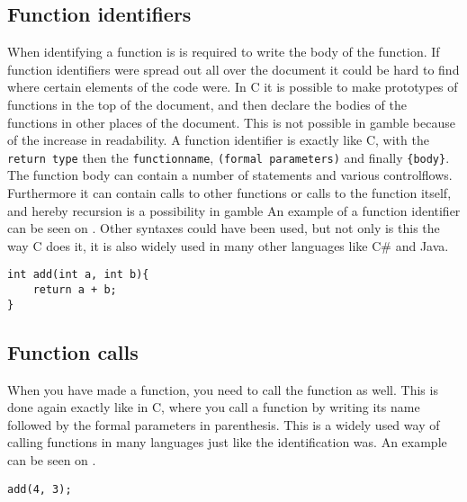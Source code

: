 \subsection*{Function identifiers}
When identifying a function is is required to write the body of the function.
If function identifiers were spread out all over the document it could be hard to find where certain elements of the code were.
In C it is possible to make prototypes of functions in the top of the document, and then declare the bodies of the functions in other places of the document. 
This is not possible in \gls{gamble} because of the increase in readability.
A function identifier is exactly like C, with the \texttt{return type} then the \texttt{functionname}, \texttt{(formal parameters)} and finally \texttt{\{body\}}.
The function body can contain a number of statements and various controlflows.
Furthermore it can contain calls to other functions or calls to the function itself, and hereby recursion is a possibility in \gls{gamble}
An example of a function identifier can be seen on .
Other syntaxes could have been used, but not only is this the way C does it, it is also widely used in many other languages like C\# and Java.


\begin{lstlisting}[caption={Function Idemtifier},label={lst:functionID}]                                                        
int add(int a, int b){
	return a + b;
}
\end{lstlisting}

\subsection*{Function calls}
When you have made a function, you need to call the function as well.
This is done again exactly like in C, where you call a function by writing its name followed by the formal parameters in parenthesis.
This is a widely used way of calling functions in many languages just like the identification was.
An example can be seen on .

\begin{lstlisting}[caption={Function Call},label={lst:functionCall}]
add(4, 3);
\end{lstlisting}


